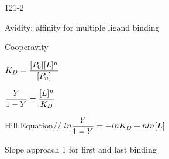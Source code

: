 \begin{mitframe}{121-2}
\begin{listone}
	\item Avidity: affinity for multiple ligand binding
    \item Cooperavity
    	\begin{listtwo}
        	\item $\dilfac_{\elecdisplace}=\dfrac{[\p_{\init}][\length]^n}{[\p_n]}$
            \item $\dfrac{Y}{1-Y}=\dfrac{[\length]^n}{\dilfac_{\elecdisplace}}$
            \item Hill Equation//
            $ln\dfrac{Y}{1-Y}=-ln\dilfac_{\elecdisplace}+n{ln}[\length]$
            	\begin{listthree}
                	\item Slope approach 1 for first and last binding
                \end{listthree}
        \end{listtwo}
\end{listone}        
\end{mitframe}